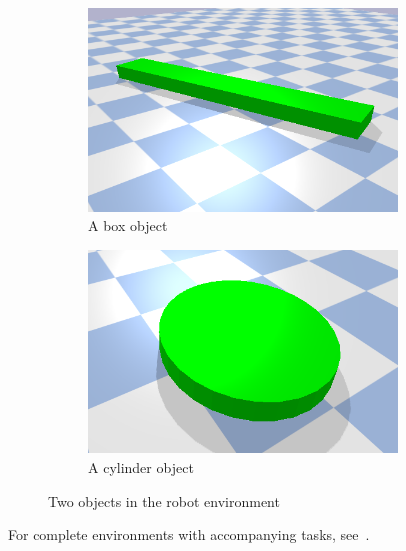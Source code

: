 \begin{figure}[H]
    \centering
    \begin{subfigure}{.5\textwidth}
    \centering
    \includegraphics[width=0.9\textwidth]{figures/introduction/box_object.png}
    \caption{A box object}
    \end{subfigure}%
    \begin{subfigure}{.5\textwidth}
    \centering
    \includegraphics[width=0.9\textwidth]{figures/introduction/cylinder_object.png}
    \caption{A cylinder object}
    \end{subfigure}%
    \caption{Two objects in the robot environment}%
    \label{fig:example_objects}
\end{figure}

For complete environments with accompanying tasks, see~.\bs

